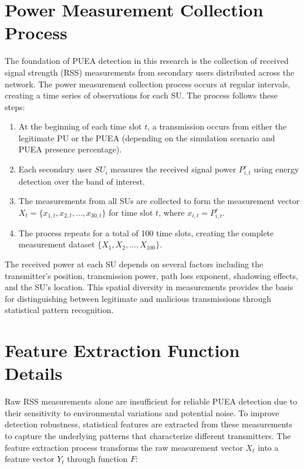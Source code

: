\section{Power Measurement Collection Process}

The foundation of PUEA detection in this research is the collection of received signal strength (RSS) measurements from secondary users distributed across the network. The power measurement collection process occurs at regular intervals, creating a time series of observations for each SU. The process follows these steps:

\begin{enumerate}
    \item At the beginning of each time slot $t$, a transmission occurs from either the legitimate PU or the PUEA (depending on the simulation scenario and PUEA presence percentage).
    
    \item Each secondary user $SU_i$ measures the received signal power $P_{i,t}^r$ using energy detection over the band of interest.
    
    \item The measurements from all SUs are collected to form the measurement vector $X_t = \{x_{1,t}, x_{2,t}, ..., x_{30,t}\}$ for time slot $t$, where $x_{i,t} = P_{i,t}^r$.
    
    \item The process repeats for a total of 100 time slots, creating the complete measurement dataset $\{X_1, X_2, ..., X_{100}\}$.
\end{enumerate}

The received power at each SU depends on several factors including the transmitter's position, transmission power, path loss exponent, shadowing effects, and the SU's location. This spatial diversity in measurements provides the basis for distinguishing between legitimate and malicious transmissions through statistical pattern recognition.

\section{Feature Extraction Function Details}

Raw RSS measurements alone are insufficient for reliable PUEA detection due to their sensitivity to environmental variations and potential noise. To improve detection robustness, statistical features are extracted from these measurements to capture the underlying patterns that characterize different transmitters. The feature extraction process transforms the raw measurement vector $X_t$ into a feature vector $Y_t$ through function $F$:

